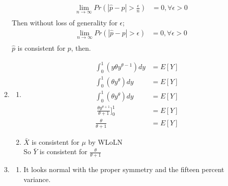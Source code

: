 \documentclass{article}
\begin{document}
\begin{enumerate}
\begin{equation*}
\begin{split}
	\lim_{n\rightarrow \infty} Pr(\left| \hat{p} - p \right| > \frac{\epsilon}{n}) &= 0, \forall \epsilon > 0 \\
	\end{split}
	\end{equation*}
	Then without loss of generality for $\epsilon$;
	\begin{equation*}
	\begin{split}
	\lim_{n\rightarrow \infty} Pr(\left| \hat{p} - p \right| > \epsilon) &= 0, \forall \epsilon > 0 \\
	\end{split}
	\end{equation*}
	$\hat{p}$ is consistent for $p$, then.
\item
	\begin{enumerate}
	\item
		\begin{equation*}
		\begin{split}
		\int_{0}^{1} (y\theta y^{\theta-1})dy &= E[Y]\\
		\int_{0}^{1} (\theta y^{\theta})dy &= E[Y]\\
		\int_{0}^{1} (\theta y^{\theta})dy &= E[Y]\\\
		\frac{\theta y ^{\theta+1}}{\theta+1}]_{0}^{1} &= E[Y] \\
		\frac{\theta}{\theta+1} &= E[Y]
		\end{split}
		\end{equation*}	
	\item
		$\bar{X}$ is consistent for $\mu$ by WLoLN \\
		So $\bar{Y}$ is consistent for $\frac{\theta}{\theta+1}$ \\
	\end{enumerate}
\item
	\begin{enumerate}
	\item
		It looks normal with the proper symmetry and the fifteen percent variance.
		\begin{figure}[h]

\end{figure}
\end{enumerate}
\end{enumerate}
\end{document}
